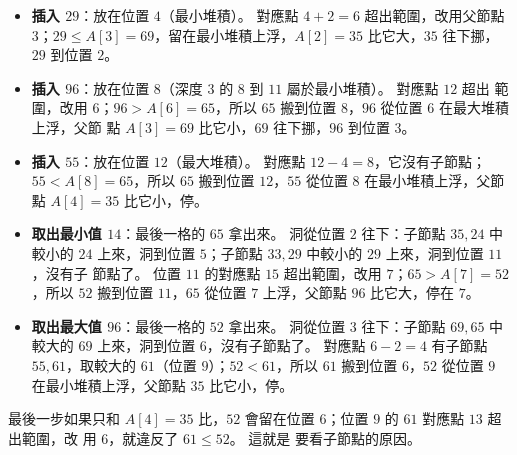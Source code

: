 \begin{itemize}
\item \textbf{插入 $29$}：放在位置 $4$（最小堆積）。 對應點 $4 + 2 = 6$ 超出範圍，改用父節點
$3$；$29 \le A[3] = 69$，留在最小堆積上浮，$A[2] = 35$ 比它大，$35$ 往下挪，$29$ 到位置 $2$。
\item \textbf{插入 $96$}：放在位置 $8$（深度 $3$ 的 $8$ 到 $11$ 屬於最小堆積）。 對應點 $12$ 超出
範圍，改用 $6$；$96 > A[6] = 65$，所以 $65$ 搬到位置 $8$，$96$ 從位置 $6$ 在最大堆積上浮，父節
點 $A[3] = 69$ 比它小，$69$ 往下挪，$96$ 到位置 $3$。
\item \textbf{插入 $55$}：放在位置 $12$（最大堆積）。 對應點 $12 - 4 = 8$，它沒有子節點；
$55 < A[8] = 65$，所以 $65$ 搬到位置 $12$，$55$ 從位置 $8$ 在最小堆積上浮，父節點 $A[4] = 35$
比它小，停。
\item \textbf{取出最小值 $14$}：最後一格的 $65$ 拿出來。 洞從位置 $2$ 往下：子節點 $35, 24$ 中
較小的 $24$ 上來，洞到位置 $5$；子節點 $33, 29$ 中較小的 $29$ 上來，洞到位置 $11$，沒有子
節點了。 位置 $11$ 的對應點 $15$ 超出範圍，改用 $7$；$65 > A[7] = 52$，所以 $52$ 搬到位置
$11$，$65$ 從位置 $7$ 上浮，父節點 $96$ 比它大，停在 $7$。
\item \textbf{取出最大值 $96$}：最後一格的 $52$ 拿出來。 洞從位置 $3$ 往下：子節點 $69, 65$ 中
較大的 $69$ 上來，洞到位置 $6$，沒有子節點了。 對應點 $6 - 2 = 4$ 有子節點 $55, 61$，取較大的
$61$（位置 $9$）；$52 < 61$，所以 $61$ 搬到位置 $6$，$52$ 從位置 $9$ 在最小堆積上浮，父節點
$35$ 比它小，停。
\end{itemize}

最後一步如果只和 $A[4] = 35$ 比，$52$ 會留在位置 $6$；位置 $9$ 的 $61$ 對應點 $13$ 超出範圍，改
用 $6$，就違反了 $61 \le 52$。 這就是  要看子節點的原因。

\begin{center}

\label{fig:hp-deap}
\end{center}

